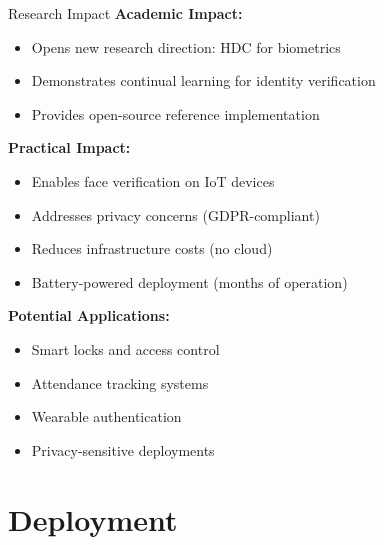 \documentclass[aspectratio=169]{beamer}
\begin{document}
\begin{frame}{Research Impact}
\textbf{Academic Impact:}
\begin{itemize}
    \item Opens new research direction: HDC for biometrics
    \item Demonstrates continual learning for identity verification
    \item Provides open-source reference implementation
\end{itemize}

\vspace{1em}

\textbf{Practical Impact:}
\begin{itemize}
    \item Enables face verification on IoT devices
    \item Addresses privacy concerns (GDPR-compliant)
    \item Reduces infrastructure costs (no cloud)
    \item Battery-powered deployment (months of operation)
\end{itemize}

\vspace{1em}

\textbf{Potential Applications:}
\begin{itemize}
    \item Smart locks and access control
    \item Attendance tracking systems
    \item Wearable authentication
    \item Privacy-sensitive deployments
\end{itemize}
\end{frame}

\section{Deployment}
\end{document}
